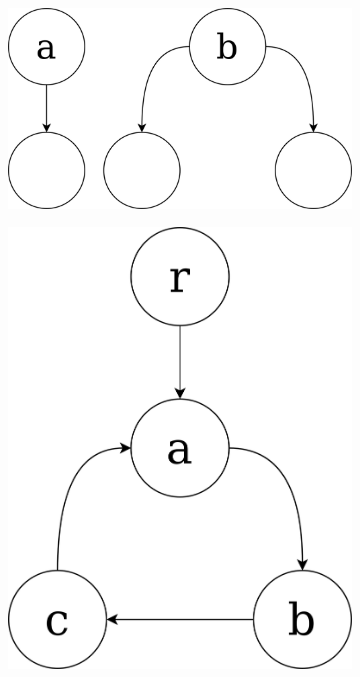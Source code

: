 \documentclass[times, dvipsnames,%
               languages={russian,english} %
              ]{itmo-student-thesis}
\begin{document}
\begin{figure}[H]
     \centering
     \begin{subfigure}[b]{0.35\linewidth}
          \centering
          \includegraphics[width=\linewidth]{non-HDS-1.png}
          \label{non-HDS-1-pic}
     \end{subfigure}
     \hfill
     \begin{subfigure}[b]{0.25\linewidth}
          \centering
          \includegraphics[width=\linewidth]{non-HDS-2.png}

\end{subfigure}
\end{figure}
\end{document}
